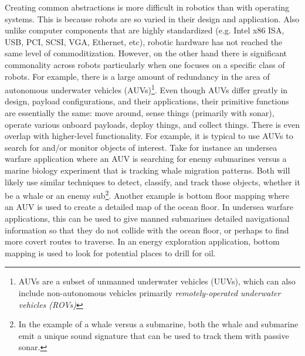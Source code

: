 Creating common abstractions is more difficult in robotics than with operating systems. This is because robots are so varied in their design and application. Also unlike computer components that are highly standardized (e.g. Intel x86 ISA, USB, PCI, SCSI, VGA, Ethernet, etc), robotic hardware has not reached the same level of commoditization.  However, on the other hand there is significant commonality across robots particularly when one focuses on a specific class of robots. For example, there is a large amount of redundancy in the area of autonomous underwater vehicles (AUVs)\footnote{AUVs are a subset of unmanned underwater vehicles (UUVs), which can also include non-autonomous vehicles primarily \textit{remotely-operated underwater vehicles (ROVs)}}. Even though AUVs differ greatly in design, payload configurations, and their applications, their primitive functions are essentially the same: move around, sense things (primarily with sonar), operate various onboard payloads, deploy things, and collect things. There is even overlap with higher-level functionality. For example, it is typical to use AUVs to search for and/or monitor objects of interest. Take for instance an undersea warfare application where an AUV is searching for enemy submarines versus a marine biology experiment that is tracking whale migration patterns. Both will likely use similar techniques to detect, classify, and track those objects, whether it be a whale or an enemy sub\footnote{In the example of a whale versus a submarine, both the whale and submarine emit a unique sound signature that can be used to track them with passive sonar.}. Another example is bottom floor mapping where an AUV is used to create a detailed map of the ocean floor. In undersea warfare applications, this can be used to give manned submarines detailed navigational information so that they do not collide with the ocean floor, or perhaps to find more covert routes to traverse. In an energy exploration application, bottom mapping is used to look for potential places to drill for oil.

